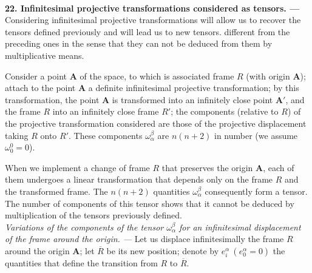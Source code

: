 
\ \\

{\bf 22. Infinitesimal projective transformations considered as tensors. --- }
% 
Considering infinitesimal projective transformations will allow us to recover the tensors defined previously and will lead us to new tensors. different from the preceding ones in the sense that they can not be deduced from them by multiplicative means.

Consider a point $\bm A$ of the space, to which is associated frame  $R$ (with origin $\bm A$); attach to the point $\bm A$ a definite infinitesimal projective transformation; by this transformation, the point $\bm A$ is transformed into an infinitely close point $\bm A'$, and the frame $R$ into an infinitely close frame $R'$; the components (relative to $R$) of the projective transformation considered are those of the projective displacement taking $R$ onto $R'$. These components $\omega^\beta_\alpha$ are $n(n+2)$ in  number (we assume $\omega^0_0 = 0$).

When we implement a change of frame $R$ that preserves the origin $\bm A$, each of them undergoes a linear transformation that depends only on the frame $R$ and the transformed frame. The $n (n + 2)$ quantities $\omega^\beta_\alpha$ consequently form a tensor. The number of components of this tensor shows that it cannot  be deduced by multiplication of the tensors previously defined.
\ \\[.2cm]

{\em Variations of the components of the tensor $\omega^\beta_\alpha$ for an infinitesimal displacement of the frame  around the origin. --- }
%
Let us displace infinitesimally the frame $R$ around the origin $\bm A$; let $\overline R$ be its new position; denote by $e^\alpha_i \ (e^\alpha_0 = 0)$ the quantities that define the transition from $R$  to $\overline R$.

